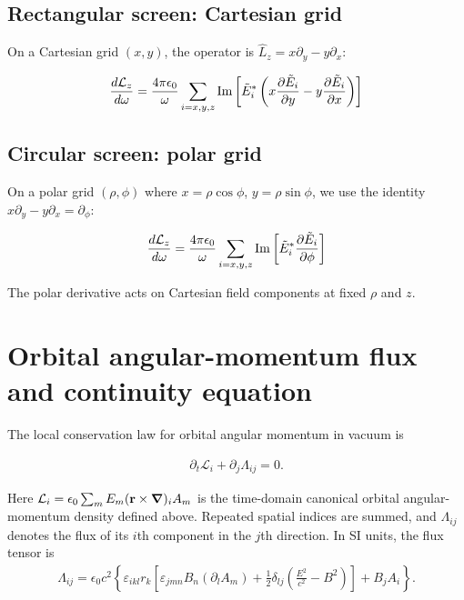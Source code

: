 \subsection{Rectangular screen: Cartesian grid}
On a Cartesian grid $(x, y)$, the operator is $\hat{L}_z = x \partial_y - y \partial_x$:
\begin{importantbox}
  \begin{align}
    \frac{d {\cal L}_z}{d\omega} = \frac{4\pi\epsilon_0}{\omega}\sum_{i=x,y,z}\operatorname{Im}\left[\tilde E_i^* \left(x \frac{\partial \tilde E_i}{\partial y} - y \frac{\partial \tilde E_i}{\partial x}\right)\right] \label{eq:canonical-oam-density-cartesian}
  \end{align}
\end{importantbox}

\subsection{Circular screen: polar grid}
On a polar grid $(\rho, \phi)$ where $x = \rho\cos\phi$, $y = \rho\sin\phi$, we use the identity $x\partial_y - y\partial_x = \partial_\phi$:
\begin{importantbox}
  \begin{align}
    \frac{d {\cal L}_z}{d\omega} = \frac{4\pi\epsilon_0}{\omega}\sum_{i=x,y,z}\operatorname{Im}\left[\tilde E_i^* \frac{\partial \tilde E_i}{\partial \phi}\right] \label{eq:canonical-oam-density-polar}
  \end{align}
\end{importantbox}

The polar derivative acts on Cartesian field components at fixed $\rho$ and $z$.

\section{Orbital angular-momentum flux and continuity equation}
\label{sec:canonical-oam-flux}

The local conservation law for orbital angular momentum in vacuum is
\begin{importantbox}
  \begin{align}
    \partial_t\mathcal L_i+\partial_j\Lambda_{ij}=0.
    \label{eq:canonical-oam-continuity}
  \end{align}
\end{importantbox}
Here $\mathcal L_i=\epsilon_0\sum_m E_m
({\bf r}\times\boldsymbol{\nabla})_i A_m$ is the time-domain canonical
orbital angular-momentum density defined above.  Repeated spatial indices
are summed, and $\Lambda_{ij}$ denotes the flux of its $i$th component in
the $j$th direction.  In SI units, the flux tensor is
\begin{align}
  \Lambda_{ij}
  =\epsilon_0c^2\left\{
    \varepsilon_{ikl}r_k\left[
      \varepsilon_{jmn}B_n(\partial_l A_m)
      +\frac12\delta_{lj}\left(\frac{E^2}{c^2}-B^2\right)
    \right]+B_j A_i
  \right\}.
  \label{eq:canonical-oam-flux-tensor}
\end{align}

